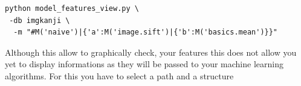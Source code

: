 \documentclass{report}
\begin{document}
\begin{lstlisting}
python model_features_view.py \
 -db imgkanji \
  -m "#M('naive')|{'a':M('image.sift')|{'b':M('basics.mean')}}"

\end{lstlisting}










Although this allow to graphically check, your features this does not allow
you yet to display informations as they will be passed to your machine learning algorithms.
For this you have to select a path and a structure
\end{document}
